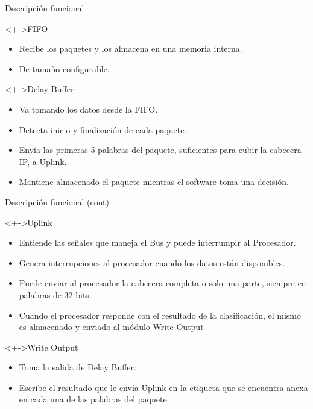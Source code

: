 \documentclass[xcolor=dvipsnames]{beamer}
\begin{document}
\begin{frame}{Descripción funcional}

\begin{block}<+->{FIFO}   
    \begin{itemize}
      \scriptsize
     	\item Recibe los paquetes y los almacena en una memoria interna.
	\item De tamaño configurable.
    \end{itemize}
  \end{block}
\begin{block}<+->{Delay Buffer}   
    \begin{itemize}
      \scriptsize
     	\item Va tomando los datos desde la FIFO.
	\item Detecta inicio y finalización de cada paquete.
	\item Envía las primeras 5 palabras del paquete, suficientes para cubir la cabecera IP, a Uplink.
	\item Mantiene almacenado el paquete mientras el software toma una decisión.
    \end{itemize}
  \end{block}
\end{frame}
\begin{frame}{Descripción funcional (cont)}
  \begin{block}<+->{Uplink}   
    \begin{itemize}
      \scriptsize
     	\item Entiende las señales que maneja el Bus y puede interrumpir al Procesador.
	\item Genera interrupciones al procesador cuando los datos están disponibles.
	\item Puede enviar al procesador la cabecera completa o solo una parte, siempre en palabras de 32 bits.
	\item Cuando el procesador responde con el resultado de la clasificación, el mismo es almacenado y enviado al módulo Write Output
    \end{itemize}
  \end{block}
\begin{block}<+->{Write Output}   
    \begin{itemize}
      \scriptsize
     	\item Toma la salida de Delay Buffer.
	\item Escribe el resultado que le envía Uplink en la etiqueta que se encuentra anexa en cada una de las palabras del paquete.
    \end{itemize}
  \end{block}
\end{frame}
\end{document}
